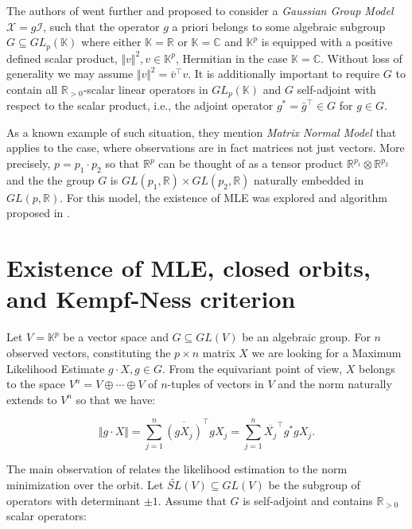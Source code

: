 \documentclass[reqno]{amsart}
\theoremstyle{plain}
\theoremstyle{definition}
\theoremstyle{remark}
\newcommand{\Chi}{\mathcal X}
\newcommand{\Rl}{\mathbb R}
\begin{document}
The authors of \cite{am} went further and proposed to consider a {\it Gaussian Group Model} $\Chi = g {\mathcal I}$, such that the operator $g$ a priori belongs to some algebraic subgroup $G\subseteq GL_p({\mathbb K})$ where either ${\mathbb K}=\Rl$ or ${\mathbb K}={\mathbb C}$ and ${\mathbb K}^p$ is equipped with a positive defined scalar product, $\Vert v\Vert ^2, v\in {\mathbb K}^p$, Hermitian in the case ${\mathbb K}={\mathbb C}$. Without loss of generality we may assume $\Vert v\Vert ^2= {\bar v}^{\top}v$. It is additionally important to require $G$ to contain all ${\mathbb R}_{>0}$-scalar linear operators in $GL_p({\mathbb K})$ and $G$ self-adjoint with respect to the scalar product, i.e., the adjoint operator  $g^*= {\bar g}^{\top}\in G$ for $g\in G$.

As a known example of such situation, they mention {\it Matrix Normal Model} that applies to the case, where observations are in fact matrices not just vectors. More precisely, $p=p_1\cdot p_2$ so that $\Rl^p$ can be thought of as a tensor product $\Rl^{p_1}\otimes \Rl^{p_2}$ and the the group $G$ is $GL(p_1,\Rl)\times GL(p_2,\Rl)$ naturally embedded in $GL(p,\Rl)$. For this model, the existence of MLE was explored and algorithm proposed in \cite{d}.



\section{Existence of MLE, closed orbits, and Kempf-Ness criterion}
Let $V={\mathbb K}^p$ be a vector space and $G\subseteq GL(V)$ be an algebraic group. For $n$ observed vectors, constituting the $p\times  n$ matrix $X$ we are looking for a Maximum Likelihood Estimate $g\cdot X, g\in G$.
From the equivariant point of view, $X$ belongs to the space $V^n=V\oplus \cdots \oplus V$ of $n$-tuples of vectors in $V$ and the norm naturally extends to $V^n$ so that we have:

\begin{equation}\label{norm_tuple}
\Vert g\cdot X\Vert = \sum_{j=1}^n \overline{(gX_j)}^{\top}gX_j=\sum_{j=1}^n \overline{X_j}^{\top} g^*g X_j.
\end{equation}

The main observation of \cite{am} relates the likelihood estimation to the norm minimization over the orbit. Let $\widetilde{SL}(V)\subseteq GL(V)$ be the subgroup of operators with determinant $\pm 1$. Assume that $G$ is self-adjoint and contains ${\mathbb R}_{>0}$ scalar operators:
\end{document}
